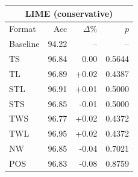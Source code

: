 \begin{tabular}{lrrr}
\toprule
\multicolumn{4}{c}{\textbf{LIME (conservative)}} \\
\midrule
Format & Acc & $\Delta$\% & $p$ \\
\midrule
Baseline & 94.22 & -- & -- \\
\midrule
TS & 96.84 & 0.00 & 0.5644 \\
TL & 96.89 & +0.02 & 0.4387 \\
STL & 96.91 & +0.01 & 0.5000 \\
STS & 96.85 & -0.01 & 0.5000 \\
TWS & 96.77 & +0.02 & 0.4372 \\
TWL & 96.95 & +0.02 & 0.4372 \\
NW & 96.85 & -0.04 & 0.7021 \\
POS & 96.83 & -0.08 & 0.8759 \\
\bottomrule
\end{tabular}